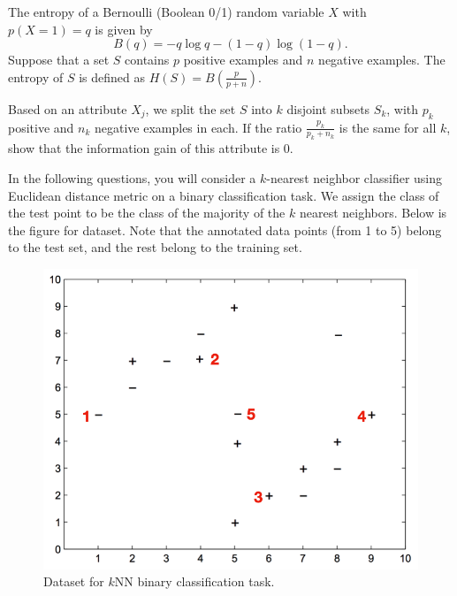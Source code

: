 \documentclass[11pt]{article}
\begin{document}
\newpage
{}

The entropy of a Bernoulli (Boolean 0/1) random variable $X$ with $p(X = 1) = q$ is given by
\begin{equation*}
B(q) = - q \log q - (1 - q) \log(1 - q).
\end{equation*}
Suppose that a set $S$ contains $p$ positive examples and $n$ negative examples. The entropy of $S$ is defined as $H(S) = B\left(\frac{p}{p+n}\right)$.

Based on an attribute $X_j$, we split the set $S$ into $k$ disjoint subsets $S_k$, with $p_k$ positive and $n_k$ negative examples in each. If the ratio $\tfrac{p_k}{p_k + n_k}$ is the same for all $k$, show that the information gain of this attribute is 0. 

\newpage
{}

In the following questions, you will consider a $k$-nearest neighbor classifier using Euclidean
distance metric on a binary classification task. 
We assign the class of the test point to be the
class of the majority of the $k$ nearest neighbors. Below is the figure for dataset. Note that the annotated data points (from 1 to 5) belong to the test set, and the rest belong to the training set.
\begin{figure}[h]
    \centering
    \includegraphics[scale=0.4]{figs/hw2_p32.png}
    \caption{Dataset for $k$NN binary classification task.}
    \label{fig:knn}
\end{figure}
\end{document}
